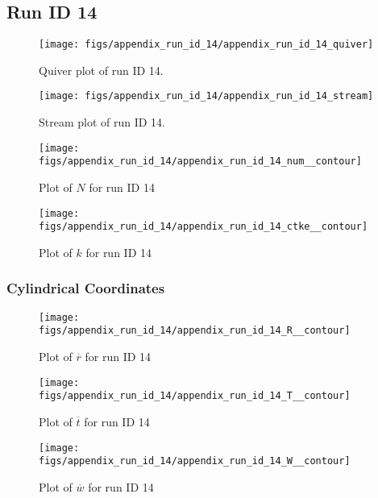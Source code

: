 \subsection{Run ID 14}
\begin{figure}[H]
\centering
\texttt{[image: figs/appendix\_run\_id\_14/appendix\_run\_id\_14\_quiver]}
\caption{Quiver plot of run ID 14.}
\label{fig:appendix_run_id_14_quiver}
\end{figure}


\begin{figure}[H]
\centering
\texttt{[image: figs/appendix\_run\_id\_14/appendix\_run\_id\_14\_stream]}
\caption{Stream plot of run ID 14.}
\label{fig:appendix_run_id_14_stream}
\end{figure}


\begin{figure}[H]
\centering
\texttt{[image: figs/appendix\_run\_id\_14/appendix\_run\_id\_14\_num\_\_contour]}
\caption{Plot of $N$ for run ID 14}
\label{fig:appendix_run_id_14_num__contour}
\end{figure}


\begin{figure}[H]
\centering
\texttt{[image: figs/appendix\_run\_id\_14/appendix\_run\_id\_14\_ctke\_\_contour]}
\caption{Plot of $k$ for run ID 14}
\label{fig:appendix_run_id_14_ctke__contour}
\end{figure}


\subsubsection{Cylindrical Coordinates}
\begin{figure}[H]
\centering
\texttt{[image: figs/appendix\_run\_id\_14/appendix\_run\_id\_14\_R\_\_contour]}
\caption{Plot of $\overline{r}$ for run ID 14}
\label{fig:appendix_run_id_14_R__contour}
\end{figure}


\begin{figure}[H]
\centering
\texttt{[image: figs/appendix\_run\_id\_14/appendix\_run\_id\_14\_T\_\_contour]}
\caption{Plot of $\overline{t}$ for run ID 14}
\label{fig:appendix_run_id_14_T__contour}
\end{figure}


\begin{figure}[H]
\centering
\texttt{[image: figs/appendix\_run\_id\_14/appendix\_run\_id\_14\_W\_\_contour]}
\caption{Plot of $\overline{w}$ for run ID 14}
\label{fig:appendix_run_id_14_W__contour}
\end{figure}


